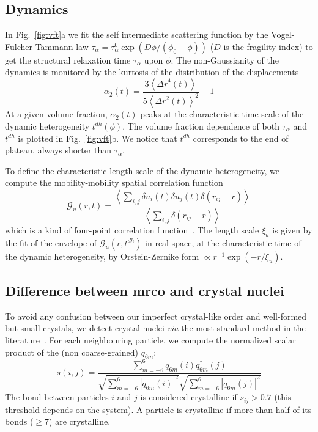 \subsection*{Dynamics}

In Fig.~\ref{fig:vft}a we fit the self intermediate scattering function by the Vogel-Fulcher-Tammann law $\tau_\alpha=\tau_\alpha^0 \exp(D\phi/(\phi_0-\phi))$ ($D$ is the fragility index) to get the structural relaxation time $\tau_\alpha$ upon $\phi$. The non-Gaussianity of the dynamics is monitored by the kurtosis of the distribution of the displacements 
\begin{equation}
	\alpha_2(t) = \frac{3 \left\langle {\Delta r}^4(t) \right\rangle}{5 {\left\langle {\Delta r}^2(t) \right\rangle}^2}-1
	\label{eq:ng}
\end{equation}
At a given volume fraction, $\alpha_2(t)$ peaks at the characteristic time scale of the dynamic heterogeneity $t^{dh}(\phi)$. The volume fraction dependence of both $\tau_\alpha$ and $t^{dh}$ is plotted in Fig.~\ref{fig:vft}b. We notice that $t^{dh}$ corresponds to the end of plateau, always shorter than $\tau_\alpha$.

To define the characteristic length scale of the dynamic heterogeneity, we compute the mobility-mobility spatial correlation function~\cite{Donati1999}
\begin{equation}
	\mathcal{G}_u(r,t) = \frac{
		\left\langle \sum_{i,j}{\delta u_i(t) \delta u_j(t) \delta(r_{ij} -r)} \right\rangle 
	}{
		\left\langle \sum_{i,j}{\delta(r_{ij} -r)} \right\rangle
	}
	\label{eq:mobility_correl}
\end{equation}
which is a kind of four-point correlation function~\cite{cavagna2009supercooled}. The length scale $\xi_u$ is given by the fit of the envelope of $\mathcal{G}_u(r,t^{dh})$ in real space, at the characteristic time of the dynamic heterogeneity, by Orstein-Zernike form $\propto r^{-1}\exp( -r/\xi_u)$.

\subsection*{Difference between {\sc mrco} and crystal nuclei}

To avoid any confusion between our imperfect crystal-like order and well-formed but small crystals, we detect crystal nuclei \emph{via} the most standard method in the literature~\cite{ReintenWolde1996}. For each neighbouring particle, we compute the normalized scalar product of the (non coarse-grained) $q_{6 m}$:
\begin{equation}
	s(i,j) = \frac{
		\sum_{m=-6}^{6} q_{6 m}(i) q_{6 m}^{*}(j)
	}{
		\sqrt{\sum_{m=-6}^{6} |q_{6 m}(i)|^2} \sqrt{\sum_{m=-6}^{6} |q_{6 m}(j)|^2}
	}
	\label{eq:boo_dot_product}
\end{equation}
The bond between particles $i$ and $j$ is considered crystalline if $s_{ij}>0.7$ (this threshold depends on the system). A particle is crystalline if more than half of its bonds ($\geq 7$) are crystalline. 

